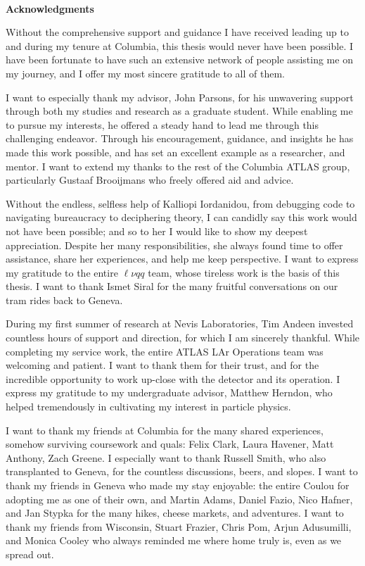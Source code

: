 ~\\[1in] %
\textbf{\Huge Acknowledgments}\bigskip

\noindent 

Without the comprehensive support and guidance I have received leading up to and during my tenure at Columbia, this thesis would never have been possible. I have been fortunate to have such an extensive network of people assisting me on my journey, and I offer my most sincere gratitude to all of them. 

I want to especially thank my advisor, John Parsons, for his unwavering support through both my studies and research as a graduate student. While enabling me to pursue my interests, he offered a steady hand to lead me through this challenging endeavor. Through his encouragement, guidance, and insights he has made this work possible, and has set an excellent example as a researcher, and mentor.
I want to extend my thanks to the rest of the Columbia ATLAS group, particularly Gustaaf Brooijmans who freely offered aid and advice. 

Without the endless, selfless help of Kalliopi Iordanidou, from debugging code to navigating bureaucracy to deciphering theory, I can candidly say this work would not have been possible; and so to her I would like to show my deepest appreciation. Despite her many responsibilities, she always found time to offer assistance, share her experiences, and help me keep perspective. I want to express my gratitude to the entire $\ell\nu qq$ team, whose tireless work is the basis of this thesis. I want to thank Ismet Siral for the many fruitful conversations on our tram rides back to Geneva.  

During my first summer of research at Nevis Laboratories, Tim Andeen invested countless hours of support and direction, for which I am sincerely thankful. While completing my service work, the entire ATLAS LAr Operations team was welcoming and patient. I want to thank them for their trust, and for the incredible opportunity to work up-close with the detector and its operation. I express my gratitude to my undergraduate advisor, Matthew Herndon, who helped tremendously in cultivating my interest in particle physics.

I want to thank my friends at Columbia for the many shared experiences, somehow surviving coursework and quals: Felix Clark, Laura Havener, Matt Anthony, Zach Greene. I especially want to thank Russell Smith, who also transplanted to Geneva, for the countless discussions, beers, and slopes. I want to thank my friends in Geneva who made my stay enjoyable: the entire Coulou for adopting me as one of their own, and Martin Adams, Daniel Fazio, Nico Hafner, and Jan Stypka for the many hikes, cheese markets, and adventures. I want to thank my friends from Wisconsin, Stuart Frazier, Chris Pom, Arjun Adusumilli, and Monica Cooley who always reminded me where home truly is, even as we spread out. 

